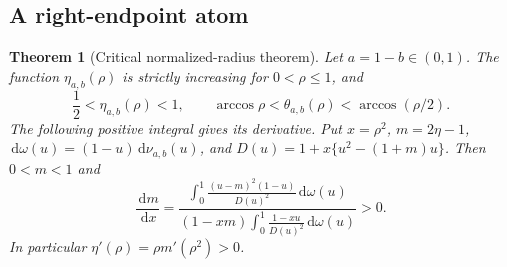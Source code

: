 \documentclass[11pt]{article}
\numberwithin{equation}{section}
\newtheorem{theorem}{Theorem}[section]
\theoremstyle{definition}\newtheorem{definition}[theorem]{Definition}
\theoremstyle{remark}\newtheorem{remark}[theorem]{Remark}
\newcommand{\dd}{\,\mathrm d}
\begin{document}
\subsection{A right-endpoint atom}
\begin{theorem}[Critical normalized-radius theorem]\label{thm:criticalradius}
Let $a=1-b\in(0,1)$. The function $\eta_{a,b}(\rho)$ is strictly
increasing for $0<\rho\le1$, and
\begin{equation}\label{eq:criticalrange}
 \frac12<\eta_{a,b}(\rho)<1,
 \qquad
 \arccos\rho<\theta_{a,b}(\rho)<\arccos(\rho/2).
\end{equation}
The following positive integral gives its derivative. Put
$x=\rho^2$, $m=2\eta-1$, $\dd\omega(u)=(1-u)\dd\nu_{a,b}(u)$,
and
$D(u)=1+x\{u^2-(1+m)u\}$. Then $0<m<1$ and
\begin{equation}\label{eq:criticalderivative}
 \frac{\dd m}{\dd x}
 =\frac{\displaystyle\int_0^1
           \frac{(u-m)^2(1-u)}{D(u)^2}\dd\omega(u)}
 {(1-xm)\displaystyle\int_0^1
           \frac{1-xu}{D(u)^2}\dd\omega(u)}>0.
\end{equation}
In particular $\eta'(\rho)=\rho m'(\rho^2)>0$.
\end{theorem}
\end{document}
